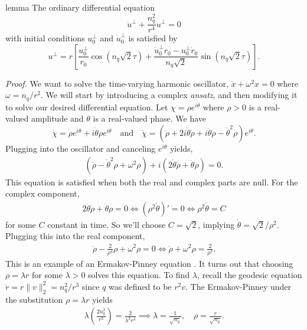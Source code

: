 \documentclass[11pt]{article}
\begin{document}
\begin{restatable}{lemma}{} \label{lemma: time varying oscillator}
    The ordinary differential equation
    \[\ddot u^{\perp} + \frac{n_q^2}{r^4}u^\perp = 0\]
    with initial conditions $u^\perp_0$ and $\dot u^\perp_0$ is satisfied by 
    \[u^{\perp} = r\left[\frac{u^{\perp}_0}{r_0}\cos(n_q\sqrt{2}\tau) + \frac{\dot u_{0}^\perp r_0 - u_{0}^\perp \dot r_0}{n_q\sqrt{2}}\sin(n_q\sqrt{2}\tau)\right].\]
\end{restatable}
\noindent \textit{Proof.} We want to solve the time-varying harmonic oscillator, $\ddot x + \omega^2x = 0$ where $\omega = n_q/r^2.$ We will start by introducing a complex \textit{ansatz}, and then modifying it to solve our desired differential equation. Let $\chi = \rho e^{i\theta}$ where $\rho >0$ is a real-valued amplitude and $\theta$ is a real-valued phase. We have
\begin{equation*}
    \dot \chi = \dot \rho e^{i\theta} + i\dot\theta\rho e^{i\theta} \quad \text{and} \quad \ddot \chi = \left(\ddot \rho  + 2i\dot \theta\dot\rho + i\ddot \theta\rho -\dot\theta^2\rho  \right)e^{i\theta}.
\end{equation*}
Plugging into the oscillator and canceling $e^{i\theta}$ yields,
\begin{align*}
    (\ddot \rho -\dot\theta^2\rho + \omega^2
    \rho)  + i(2\dot \theta\dot\rho + \ddot \theta\rho) = 0.
\end{align*}
This equation is satisfied when both the real and complex parts are null. For the complex component,
\begin{align*}
    2\dot \theta\dot\rho + \ddot \theta\rho = 0 
    \iff (\rho^2\dot\theta)' = 0 \iff \rho^2\dot\theta = C 
\end{align*}
for some $C$ constant in time. So we'll choose $C = \sqrt{2}$, implying $\dot\theta = \sqrt{2}/\rho^2$. Plugging this into the real component,
\begin{align*}
    \ddot \rho -\frac{2}{\rho^4}\rho + \omega^2
    \rho = 0     \iff\ddot \rho  + \omega^2
    \rho = \frac{2}{\rho^3}.
\end{align*}
This is an example of an Ermakov-Pinney equation \cite{ermakov1880equations, pinney1950nonlinear}. It turns out that choosing $\rho  = \lambda r$ for some $\lambda > 0$ solves this equation. To find $\lambda$, recall the geodesic equation $\ddot r = r\|v\|_2^2 = n_q^2/r^3$ since $q$ was defined to be $r^2v$. The Ermakov-Pinney under the substitution $\rho = \lambda r$ yields
\begin{align*}
    \lambda\left(\frac{ 2n_q^2}{r^3}\right) =  \frac{2}{\lambda^3r^3} \implies \lambda = \frac{1}{\sqrt{n_q}}, \quad \rho = \frac{r}{\sqrt{n_q}}.
\end{align*}
\end{document}
